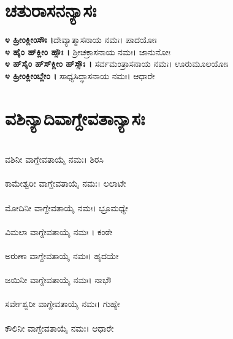 \section{ಚತುರಾಸನನ್ಯಾಸಃ}
{\bfseries ೪ ಹ್ರೀಂಕ್ಲೀಂಸೌಃ ।}ದೇವ್ಯಾತ್ಮಾಸನಾಯ ನಮಃ। ಪಾದಯೋಃ\\
{\bfseries ೪ ಹೈಂ ಹ್‌ಕ್ಲೀಂ ಹ್ಸೌಃ ।} ಶ್ರೀಚಕ್ರಾಸನಾಯ ನಮಃ। ಜಾನುನೋಃ\\
{\bfseries ೪ ಹ್‌ಸೈಂ ಹ್‌ಸ್‌ಕ್ಲೀಂ ಹ್‌ಸ್ಸೌಃ ।} ಸರ್ವಮಂತ್ರಾಸನಾಯ ನಮಃ। ಊರುಮೂಲಯೋಃ\\
{\bfseries ೪ ಹ್ರೀಂಕ್ಲೀಂಬ್ಲೇಂ ।} ಸಾಧ್ಯಸಿದ್ಧಾಸನಾಯ ನಮಃ। ಆಧಾರೇ
\section{ವಶಿನ್ಯಾದಿವಾಗ್ದೇವತಾನ್ಯಾಸಃ}
\\ ವಶಿನೀ ವಾಗ್ದೇವತಾಯೈ ನಮಃ। ಶಿರಸಿ\\
\\ ಕಾಮೇಶ್ವರೀ ವಾಗ್ದೇವತಾಯೈ ನಮಃ। ಲಲಾಟೇ\\
\\ ಮೋದಿನೀ ವಾಗ್ದೇವತಾಯೈ ನಮಃ। ಭ್ರೂಮಧ್ಯೇ\\
\\ ವಿಮಲಾ ವಾಗ್ದೇವತಾಯೈ ನಮಃ । ಕಂಠೇ\\
\\ ಅರುಣಾ ವಾಗ್ದೇವತಾಯೈ ನಮಃ। ಹೃದಯೇ\\
\\ ಜಯಿನೀ ವಾಗ್ದೇವತಾಯೈ ನಮಃ। ನಾಭೌ\\
\\ ಸರ್ವೇಶ್ವರೀ ವಾಗ್ದೇವತಾಯೈ ನಮಃ। ಗುಹ್ಯೇ\\
\\ ಕೌಲಿನೀ ವಾಗ್ದೇವತಾಯೈ ನಮಃ। ಆಧಾರೇ
